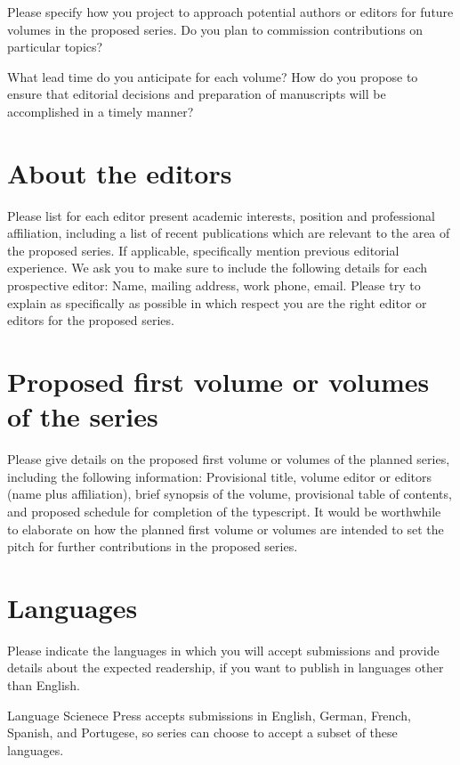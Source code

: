 Please specify how you project to approach potential authors or editors
for future volumes in the proposed series. Do you plan to commission
contributions on particular topics?

What lead time do you anticipate for each volume? How do you propose
to ensure that editorial decisions and preparation of manuscripts
will be accomplished in a timely manner?


\section{About the editors}

Please list for each editor present academic interests, position and
professional affiliation, including a list of recent publications
which are relevant to the area of the proposed series. If applicable,
specifically mention previous editorial experience. We ask you to
make sure to include the following details for each prospective editor:
Name, mailing address, work phone, email. Please try to explain as
specifically as possible in which respect you are the right editor
or editors for the proposed series.


\section{Proposed first volume or volumes of the series}

Please give details on the proposed first volume or volumes of the
planned series, including the following information: Provisional title,
volume editor or editors (name plus affiliation), brief synopsis of
the volume, provisional table of contents, and proposed schedule for
completion of the typescript. It would be worthwhile to elaborate
on how the planned first volume or volumes are intended to set the
pitch for further contributions in the proposed series.

\section{Languages}

Please indicate the languages in which you will accept submissions and provide details about the
expected readership, if you want to publish in languages other than English.

Language Scienece Press accepts submissions in English, German, French, Spanish,
and Portugese, so series can choose to accept a subset of these languages.

